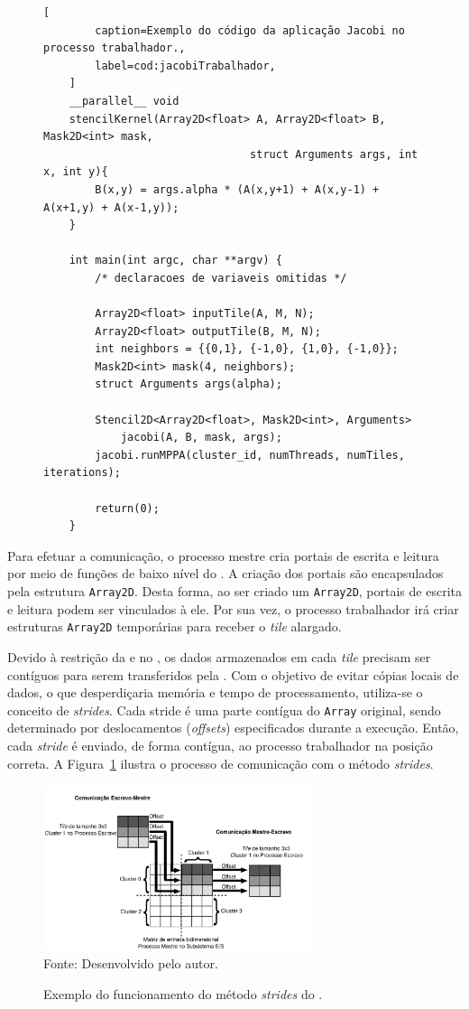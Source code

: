 \begin{figure}[!h]
	\begin{lstlisting}[
		caption=Exemplo do código da aplicação Jacobi no processo trabalhador.,
		label=cod:jacobiTrabalhador,
	]
	__parallel__ void
	stencilKernel(Array2D<float> A, Array2D<float> B, Mask2D<int> mask,
								struct Arguments args, int x, int y){
		B(x,y) = args.alpha * (A(x,y+1) + A(x,y-1) + A(x+1,y) + A(x-1,y));
	}

	int main(int argc, char **argv) {
		/* declaracoes de variaveis omitidas */

		Array2D<float> inputTile(A, M, N);
		Array2D<float> outputTile(B, M, N);
		int neighbors = {{0,1}, {-1,0}, {1,0}, {-1,0}};
		Mask2D<int> mask(4, neighbors);
		struct Arguments args(alpha);

		Stencil2D<Array2D<float>, Mask2D<int>, Arguments>
			jacobi(A, B, mask, args);
		jacobi.runMPPA(cluster_id, numThreads, numTiles, iterations);

		return(0);
	}
\end{lstlisting}
\end{figure}



Para efetuar a comunicação, o processo mestre cria portais de escrita e leitura
por meio de funções de baixo nível do \mppa. A criação dos portais são encapsulados pela
estrutura \texttt{Array2D}. Desta forma, ao ser criado um \texttt{Array2D},
portais de escrita e leitura podem ser vinculados à ele. Por sua vez, o
processo trabalhador irá criar estruturas \texttt{Array2D} temporárias para
receber o \textit{tile} alargado.

Devido à restrição da \api e \noc no \mppa, os dados armazenados em cada
\textit{tile} precisam ser contíguos para serem transferidos pela \noc. Com o
objetivo de evitar cópias locais de dados, o que desperdiçaria memória e tempo
de processamento, utiliza-se o conceito de \textit{strides}. Cada stride é uma
parte contígua do \texttt{Array} original, sendo determinado por deslocamentos
(\textit{offsets}) especificados durante a execução. Então, cada \textit{stride}
é enviado, de forma contígua, ao processo trabalhador na posição correta. A
Figura~\ref{fig:strides} ilustra o processo de comunicação com o método
\textit{strides}.

\begin{figure}[!h]
	\centering
	\caption{Exemplo do funcionamento do método \textit{strides} do \mppa.}
	\includegraphics[width=0.7\textwidth]{figs/stridesImage.pdf} \\
    Fonte: Desenvolvido pelo autor.
	\label{fig:strides}
\end{figure}

